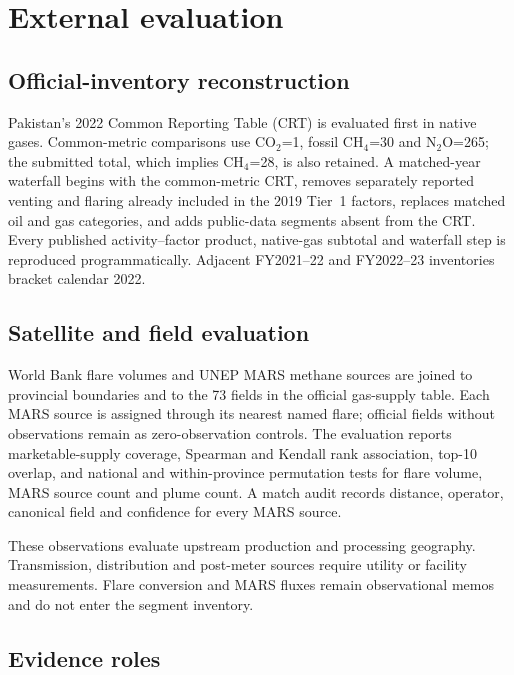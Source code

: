 \section{External evaluation}
\label{sec:validation}

\subsection{Official-inventory reconstruction}

Pakistan's 2022 Common Reporting Table (CRT) is evaluated first in native gases. Common-metric
comparisons use CO$_2$=1, fossil CH$_4$=30 and N$_2$O=265; the submitted total, which implies
CH$_4$=28, is also retained. A matched-year waterfall begins with the common-metric CRT, removes
separately reported venting and flaring already included in the 2019 Tier~1 factors, replaces
matched oil and gas categories, and adds public-data segments absent from the CRT. Every
published activity--factor product, native-gas subtotal and waterfall step is reproduced
programmatically. Adjacent FY2021--22 and FY2022--23 inventories bracket calendar 2022.

\subsection{Satellite and field evaluation}

World Bank flare volumes and UNEP MARS methane sources are joined to provincial boundaries and
to the 73 fields in the official gas-supply table. Each MARS source is assigned through its
nearest named flare; official fields without observations remain as zero-observation controls.
The evaluation reports marketable-supply coverage, Spearman and Kendall rank association, top-10
overlap, and national and within-province permutation tests for flare volume, MARS source count
and plume count. A match audit records distance, operator, canonical field and confidence for
every MARS source.

These observations evaluate upstream production and processing geography. Transmission,
distribution and post-meter sources require utility or facility measurements. Flare conversion
and MARS fluxes remain observational memos and do not enter the segment inventory.

\subsection{Evidence roles}

